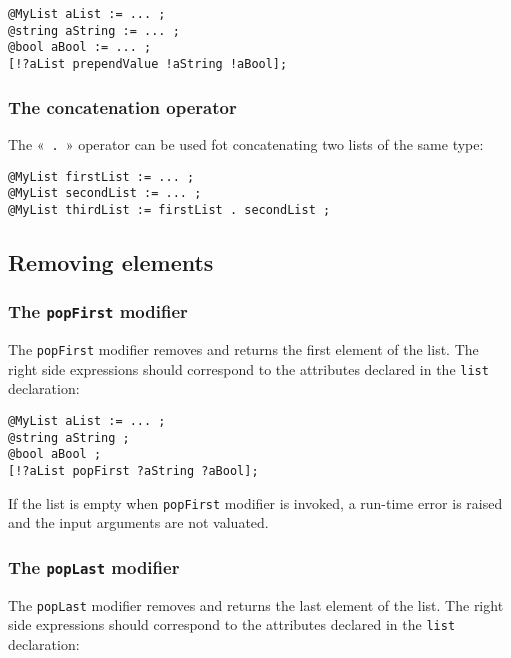 \begin{lstlisting}[language=galgas]
@MyList aList := ... ;
@string aString := ... ;
@bool aBool := ... ;
[!?aList prependValue !aString !aBool];
\end{lstlisting}

\subsubsection{The concatenation operator}

The «~\lstinline[language=galgas]!.!~» operator can be used fot concatenating two lists of the same type:


\begin{lstlisting}[language=galgas]
@MyList firstList := ... ;
@MyList secondList := ... ;
@MyList thirdList := firstList . secondList ;
\end{lstlisting}

\subsection{Removing elements}

\subsubsection{The \lstinline[language=galgas]!popFirst! modifier}


The \lstinline[language=galgas]!popFirst! modifier removes and returns the first element of the list. The right side expressions should correspond to the attributes declared in the \lstinline[language=galgas]!list! declaration:\\

\begin{lstlisting}[language=galgas]
@MyList aList := ... ;
@string aString ;
@bool aBool ;
[!?aList popFirst ?aString ?aBool];
\end{lstlisting}

If the list is empty when \lstinline[language=galgas]!popFirst! modifier is invoked, a run-time error is raised and the input arguments are not valuated.

\subsubsection{The \lstinline[language=galgas]!popLast! modifier}


The \lstinline[language=galgas]!popLast! modifier removes and returns the last element of the list. The right side expressions should correspond to the attributes declared in the \lstinline[language=galgas]!list! declaration:

